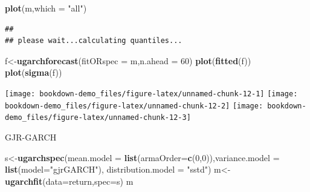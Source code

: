 \documentclass[
  12pt,
  a4paper,
  openany]{book}
\newenvironment{Shaded}{\begin{snugshade}}{\end{snugshade}}
\newcommand{\DataTypeTok}[1]{\textcolor[rgb]{0.13,0.29,0.53}{#1}}
\newcommand{\DecValTok}[1]{\textcolor[rgb]{0.00,0.00,0.81}{#1}}
\newcommand{\KeywordTok}[1]{\textcolor[rgb]{0.13,0.29,0.53}{\textbf{#1}}}
\newcommand{\NormalTok}[1]{#1}
\newcommand{\StringTok}[1]{\textcolor[rgb]{0.31,0.60,0.02}{#1}}
\begin{document}
\begin{Shaded}
\begin{Highlighting}[]
\KeywordTok{plot}\NormalTok{(m,}\DataTypeTok{which =} \StringTok{"all"}\NormalTok{)}
\end{Highlighting}
\end{Shaded}

\begin{verbatim}
## 
## please wait...calculating quantiles...
\end{verbatim}

\begin{Shaded}
\begin{Highlighting}[]
\NormalTok{f\textless{}{-}}\KeywordTok{ugarchforecast}\NormalTok{(}\DataTypeTok{fitORspec =}\NormalTok{ m,}\DataTypeTok{n.ahead =} \DecValTok{60}\NormalTok{)}
\KeywordTok{plot}\NormalTok{(}\KeywordTok{fitted}\NormalTok{(f))}
\KeywordTok{plot}\NormalTok{(}\KeywordTok{sigma}\NormalTok{(f))}
\end{Highlighting}
\end{Shaded}

\begin{center}\texttt{[image: bookdown-demo\_files/figure-latex/unnamed-chunk-12-1]} \texttt{[image: bookdown-demo\_files/figure-latex/unnamed-chunk-12-2]} \texttt{[image: bookdown-demo\_files/figure-latex/unnamed-chunk-12-3]} \end{center}

GJR-GARCH

\begin{Shaded}
\begin{Highlighting}[]
\NormalTok{s\textless{}{-}}\KeywordTok{ugarchspec}\NormalTok{(}\DataTypeTok{mean.model =} \KeywordTok{list}\NormalTok{(}\DataTypeTok{armaOrder=}\KeywordTok{c}\NormalTok{(}\DecValTok{0}\NormalTok{,}\DecValTok{0}\NormalTok{)),}\DataTypeTok{variance.model =} \KeywordTok{list}\NormalTok{(}\DataTypeTok{model=}\StringTok{"gjrGARCH"}\NormalTok{),}
              \DataTypeTok{distribution.model =} \StringTok{"sstd"}\NormalTok{)}
\NormalTok{m\textless{}{-}}\KeywordTok{ugarchfit}\NormalTok{(}\DataTypeTok{data=}\NormalTok{return,}\DataTypeTok{spec=}\NormalTok{s)}
\NormalTok{m}
\end{Highlighting}
\end{Shaded}
\end{document}
